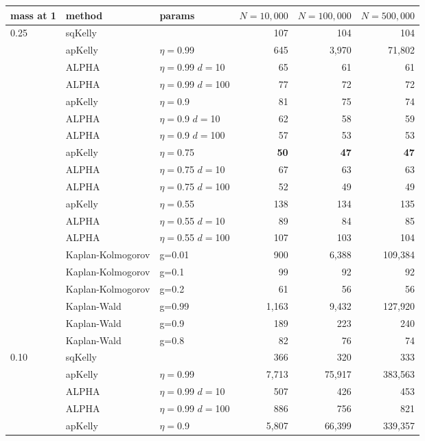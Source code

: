\documentclass[aoas]{imsart}
\begin{document}
\begin{table}
\centering
\tiny
\begin{tabular}{lll|rrr} 
 mass at 1 & method & params & $N=10{,}000$ &  $N=100{,}000$ & $N=500{,}000$  \\
\hline 0.25 & sqKelly & & 107  & 104  & 104  \\
\cline{2-6} & apKelly & $\eta=$0.99 & 645  & 3,970  & 71,802  \\
\cline{2-6}
& ALPHA & $\eta=$0.99 $d=$10 & 65  & 61  & 61  \\
& ALPHA & $\eta=$0.99 $d=$100 & 77  & 72  & 72  \\
\cline{2-6} & apKelly & $\eta=$0.9 & 81  & 75  & 74  \\
\cline{2-6}
& ALPHA & $\eta=$0.9 $d=$10 & 62  & 58  & 59  \\
& ALPHA & $\eta=$0.9 $d=$100 & 57  & 53  & 53  \\
\cline{2-6} & apKelly & $\eta=$0.75 & \bf{50}  & \bf{47}  & \bf{47}  \\
\cline{2-6}
& ALPHA & $\eta=$0.75 $d=$10 & 67  & 63  & 63  \\
& ALPHA & $\eta=$0.75 $d=$100 & 52  & 49  & 49  \\
\cline{2-6} & apKelly & $\eta=$0.55 & 138  & 134  & 135  \\
\cline{2-6}
& ALPHA & $\eta=$0.55 $d=$10 & 89  & 84  & 85  \\
& ALPHA & $\eta=$0.55 $d=$100 & 107  & 103  & 104  \\
\cline{2-6}
 & Kaplan-Kolmogorov & g=0.01 & 900  & 6,388  & 109,384  \\
 & Kaplan-Kolmogorov & g=0.1 & 99  & 92  & 92  \\
 & Kaplan-Kolmogorov & g=0.2 & 61  & 56  & 56  \\
\cline{2-6}
 & Kaplan-Wald & g=0.99 & 1,163  & 9,432  & 127,920  \\
 & Kaplan-Wald & g=0.9 & 189  & 223  & 240  \\
 & Kaplan-Wald & g=0.8 & 82  & 76  & 74  \\
\hline 0.10 & sqKelly & & 366  & 320  & 333  \\
\cline{2-6} & apKelly & $\eta=$0.99 & 7,713  & 75,917  & 383,563  \\
\cline{2-6}
& ALPHA & $\eta=$0.99 $d=$10 & 507  & 426  & 453  \\
& ALPHA & $\eta=$0.99 $d=$100 & 886  & 756  & 821  \\
\cline{2-6} & apKelly & $\eta=$0.9 & 5,807  & 66,399  & 339,357  \\

\end{tabular}
\end{table}
\end{document}
